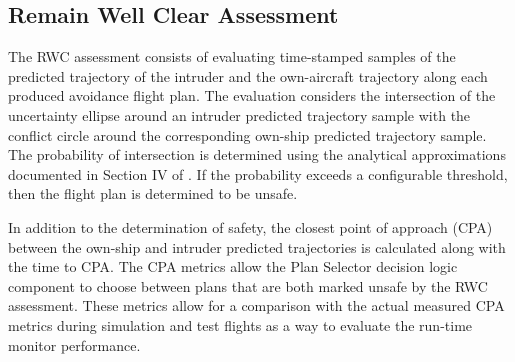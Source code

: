 \subsection{Remain Well Clear Assessment} 
The RWC assessment consists of evaluating time-stamped samples of the predicted trajectory of the intruder and the own-aircraft trajectory along each produced avoidance flight plan. The evaluation considers the intersection of the uncertainty ellipse around an intruder predicted trajectory sample with the conflict circle around the corresponding own-ship predicted trajectory sample. The probability of intersection is determined using the analytical approximations documented in Section IV of \cite{prob_conflict_detection}. If the probability exceeds a configurable threshold, then the flight plan is determined to be unsafe. 

In addition to the determination of safety, the closest point of approach (CPA) between the own-ship and intruder predicted trajectories is calculated along with the time to CPA. The CPA metrics allow the Plan Selector decision logic component to choose between plans that are both marked unsafe by the RWC assessment. These metrics allow for a comparison with the actual measured CPA metrics during simulation and test flights as a way to evaluate the run-time monitor performance.

